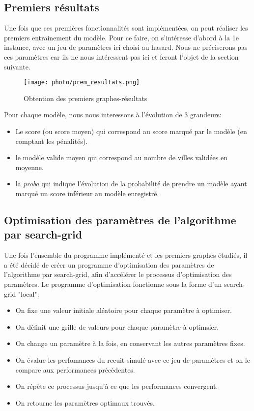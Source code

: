 \documentclass[a4paper, 12pt]{article}
\begin{document}
\subsection{Premiers résultats}
Une fois que ces premières fonctionnalités sont implémentées, on peut réaliser les premiers entrainement du modèle. Pour ce faire, on s'intéresse d'abord à la 1e instance, avec un jeu de paramètres ici choisi au hasard. Nous ne préciserons pas ces paramètres car ils ne nous intéressent pas ici et feront l'objet de la section suivante.
\begin{figure}[!h]
    \centering
    \texttt{[image: photo/prem\_resultats.png]}
    \caption{Obtention des premiers graphes-résultats}
\end{figure}
Pour chaque modèle, nous nous interessons à l'évolution de 3 grandeurs:
\begin{itemize}
    \item Le score (ou score moyen) qui correspond au score marqué par le modèle (en comptant les pénalités).
    \item le modèle valide moyen qui correspond au nombre de villes validées en moyenne.
    \item la \textit{proba} qui indique l'évolution de la probabilité de prendre un modèle ayant marqué un score inférieur au modèle enregistré.
\end{itemize}

\subsection{Optimisation des paramètres de l'algorithme par search-grid}
Une fois l'ensemble du programme implémenté et les premiers graphes étudiés, il a été décidé de créer un programme d'optimisation des paramètres de l'algorithme par search-grid, afin d'accélérer le processus d'optimisation des paramètres.
Le programme d'optimisation fonctionne sous la forme d'un search-grid "local":
\begin{itemize}
    \item On fixe une valeur initiale aléatoire pour chaque paramètre à optimiser.
    \item On définit une grille de valeurs pour chaque paramètre à optimsier.
    \item On change un paramètre à la fois, en conservant les autres paramètres fixes.
    \item On évalue les perfomances du recuit-simulé avec ce jeu de paramètres et on le compare aux performances précédentes.
    \item On répète ce processus jusqu'à ce que les performances convergent.
    \item On retourne les paramètres optimaux trouvés.
\end{itemize}
\end{document}

